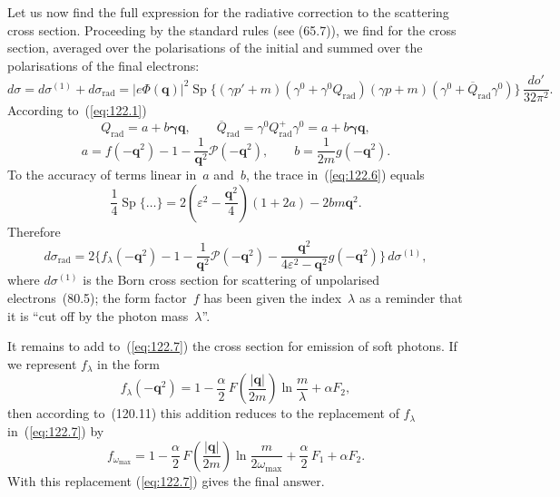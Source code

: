 Let us now find the full expression for the radiative correction to the scattering cross section. Proceeding by the standard rules (see (65.7)), we find for the cross section, averaged over the polarisations of the initial and summed over the polarisations of the final electrons:
\begin{equation}
d\sigma = d\sigma^{(1)} + d\sigma_{\text{rad}} =
|e\Phi(\mathbf{q})|^2\operatorname{Sp}\{(\gamma p'+m)(\gamma^0+\gamma^0 Q_{\text{rad}})(\gamma p+m)(\gamma^0+\overline{Q}_{\text{rad}}\gamma^0)\}\,\frac{do'}{32\pi^2}.
\label{eq:122.6}
\end{equation}
According to~(\ref{eq:122.1})
\[
Q_{\text{rad}} = a + b\boldsymbol{\gamma}\mathbf{q},\qquad \overline{Q}_{\text{rad}} = \gamma^0 Q_{\text{rad}}^+ \gamma^0 = a + b\boldsymbol{\gamma}\mathbf{q},
\]
\[
a = f(-\mathbf{q}^2) - 1 - \frac{1}{\mathbf{q}^2}\mathcal{P}(-\mathbf{q}^2),\qquad b = \frac{1}{2m}g(-\mathbf{q}^2).
\]
To the accuracy of terms linear in~$a$ and~$b$, the trace in~(\ref{eq:122.6}) equals
\[
\frac{1}{4}\operatorname{Sp}\{\ldots\} = 2\!\left(\varepsilon^2 - \frac{\mathbf{q}^2}{4}\right)(1+2a) - 2bm\mathbf{q}^2.
\]
Therefore
\begin{equation}
d\sigma_{\text{rad}} = 2\biggl\{f_\lambda(-\mathbf{q}^2) - 1 - \frac{1}{\mathbf{q}^2}\mathcal{P}(-\mathbf{q}^2) - \frac{\mathbf{q}^2}{4\varepsilon^2-\mathbf{q}^2}g(-\mathbf{q}^2)\biggr\}\,d\sigma^{(1)},
\label{eq:122.7}
\end{equation}
where $d\sigma^{(1)}$ is the Born cross section for scattering of unpolarised electrons~(80.5); the form factor~$f$ has been given the index~$\lambda$ as a reminder that it is ``cut off by the photon mass~$\lambda$''.

It remains to add to~(\ref{eq:122.7}) the cross section for emission of soft photons. If we represent $f_\lambda$ in the form
\begin{equation}
f_\lambda(-\mathbf{q}^2) = 1 - \frac{\alpha}{2}\,F\!\left(\frac{|\mathbf{q}|}{2m}\right)\ln\frac{m}{\lambda} + \alpha F_2,
\label{eq:122.8}
\end{equation}
then according to~(120.11) this addition reduces to the replacement of $f_\lambda$ in~(\ref{eq:122.7}) by
\begin{equation}
f_{\omega_{\max}} = 1 - \frac{\alpha}{2}\,F\!\left(\frac{|\mathbf{q}|}{2m}\right)\ln\frac{m}{2\omega_{\max}} + \frac{\alpha}{2}\,F_1 + \alpha F_2.
\label{eq:122.9}
\end{equation}
With this replacement (\ref{eq:122.7}) gives the final answer.

